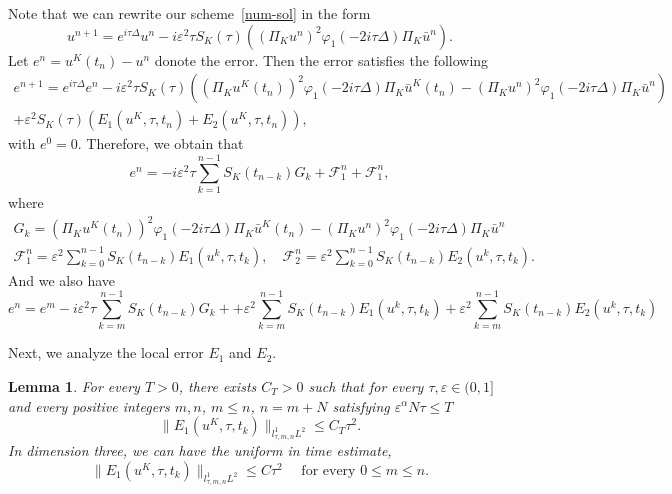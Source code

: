 \documentclass[10pt,a4paper]{article}
\newtheorem{lemma}[theorem]{Lemma}
\begin{document}
  Note that we can rewrite our scheme~\eqref{num-sol} in the form 
  \[ 
    u^{n+1} = e^{i\tau\Delta}u^n - i\varepsilon^2\tau S_K(\tau) 
    \left( (\Pi_K u^n)^2 \varphi_1(-2i\tau\Delta)\Pi_K \bar{u}^n \right).
  \]
  Let \( e^n = u^K(t_n) - u^n \) donote the error. Then the error satisfies 
  the following 
  \begin{multline}
    e^{n+1} = e^{i\tau\Delta}e^n - i \varepsilon^2 \tau S_K(\tau) \left( 
    \left(\Pi_K u^K(t_n)\right)^2 \varphi_1(-2i\tau\Delta)\Pi_K \bar{u}^K(t_n)
    - (\Pi_K u^n)^2 \varphi_1(-2i\tau\Delta)\Pi_K \bar{u}^n \right) \\ 
    + \varepsilon^2 S_K(\tau) \left( E_1(u^K, \tau, t_n) + E_2(u^K, \tau, t_n) 
    \right),
  \end{multline}
  with \( e^0 = 0 \). Therefore, we obtain that 
  \begin{equation}
    e^n = -i \varepsilon^2 \tau \sum_{k=1}^{n-1}
    S_K(t_{n-k})G_k + \mathcal F_1^{n} + \mathcal F_1^{n},
  \end{equation}
  where
  \begin{align}
    \label{Gk} G_k = \left(\Pi_K u^K(t_n)\right)^2 \varphi_1(-2i\tau\Delta)\Pi_K 
    \bar{u}^K(t_n) - (\Pi_K u^n)^2 \varphi_1(-2i\tau\Delta)\Pi_K \bar{u}^n \\
    \label{F1F2} \mathcal F^{n}_1 = \varepsilon^2 \sum_{k=0}^{n-1} S_K(t_{n-k}) E_1(u^k, \tau, t_k), \quad
    \mathcal F^{n}_2 = \varepsilon^2 \sum_{k=0}^{n-1} S_K(t_{n-k}) E_2(u^k, \tau, t_k).
  \end{align}
  And we also have 
  \begin{equation}\label{emn}
    e^n = e^m -i \varepsilon^2 \tau \sum_{k=m}^{n-1}
    S_K(t_{n-k})G_k + 
    + \varepsilon^2 \sum_{k=m}^{n-1} S_K(t_{n-k}) E_1(u^k, \tau, t_k)
    + \varepsilon^2 \sum_{k=m}^{n-1} S_K(t_{n-k}) E_2(u^k, \tau, t_k)
  \end{equation}
  
  Next, we analyze the local error \(E_1\) and \(E_2\).

  \begin{lemma}\label{lemE1} %
    For every \( T > 0 \),
    there exists \(C_T>0\) such that for every \( \tau, \varepsilon
    \in (0,1] \) and every positive integers \(m,n\), \(m \leq n\), \(n=m+N\)
    satisfying \(\varepsilon^\alpha N\tau \leq T\)
    \begin{equation}
      \|E_1(u^K,\tau,t_k)\|_{l^1_{\tau,m,n}L^2} \leq C_T \tau^2.
    \end{equation}
    In dimension three, we can have the uniform in time estimate,
    \begin{equation}
      \|E_1(u^K,\tau,t_k)\|_{l^1_{\tau,m,n}L^2} \leq C \tau^2 \quad \text{ for
      every } 0 \leq m \leq n.
    \end{equation}
  \end{lemma}
\end{document}
